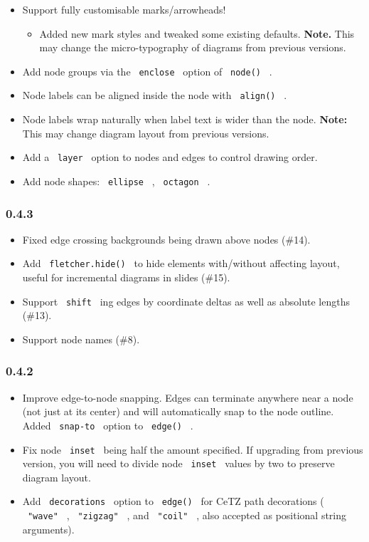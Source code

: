 \begin{itemize}
\tightlist
\item
  Support fully customisable marks/arrowheads!

  \begin{itemize}
  \tightlist
  \item
    Added new mark styles and tweaked some existing defaults.
    \textbf{Note.} This may change the micro-typography of diagrams from
    previous versions.
  \end{itemize}
\item
  Add node groups via the \texttt{\ enclose\ } option of
  \texttt{\ node()\ } .
\item
  Node labels can be aligned inside the node with \texttt{\ align()\ } .
\item
  Node labels wrap naturally when label text is wider than the node.
  \textbf{Note:} This may change diagram layout from previous versions.
\item
  Add a \texttt{\ layer\ } option to nodes and edges to control drawing
  order.
\item
  Add node shapes: \texttt{\ ellipse\ } , \texttt{\ octagon\ } .
\end{itemize}

\subsubsection{0.4.3}\label{section-5}

\begin{itemize}
\tightlist
\item
  Fixed edge crossing backgrounds being drawn above nodes (\#14).
\item
  Add \texttt{\ fletcher.hide()\ } to hide elements with/without
  affecting layout, useful for incremental diagrams in slides (\#15).
\item
  Support \texttt{\ shift\ } ing edges by coordinate deltas as well as
  absolute lengths (\#13).
\item
  Support node names (\#8).
\end{itemize}

\subsubsection{0.4.2}\label{section-6}

\begin{itemize}
\tightlist
\item
  Improve edge-to-node snapping. Edges can terminate anywhere near a
  node (not just at its center) and will automatically snap to the node
  outline. Added \texttt{\ snap-to\ } option to \texttt{\ edge()\ } .
\item
  Fix node \texttt{\ inset\ } being half the amount specified. If
  upgrading from previous version, you will need to divide node
  \texttt{\ inset\ } values by two to preserve diagram layout.
\item
  Add \texttt{\ decorations\ } option to \texttt{\ edge()\ } for CeTZ
  path decorations ( \texttt{\ "wave"\ } , \texttt{\ "zigzag"\ } , and
  \texttt{\ "coil"\ } , also accepted as positional string arguments).
\end{itemize}

